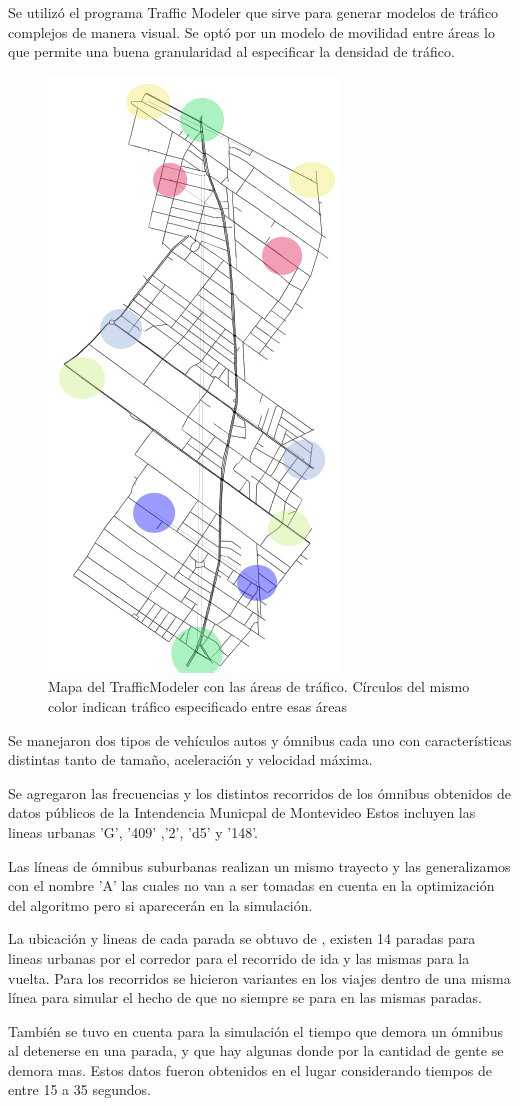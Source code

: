 Se utilizó el programa Traffic Modeler \citep{TrafficModeler} que sirve para generar modelos de tráfico complejos de manera visual. Se optó por un modelo de movilidad entre áreas lo que permite una buena granularidad al especificar la densidad de tráfico.


\begin{figure}[h]
	\centering
	\includegraphics[width=0.3\linewidth]{Figures/areaflow1}
	\caption{Mapa del TrafficModeler con las áreas de tráfico. Círculos del mismo color indican tráfico especificado entre esas áreas}
	\label{fig:areaflow1}
\end{figure}


Se manejaron dos tipos de vehículos autos y ómnibus cada uno con características distintas tanto de tamaño, aceleración y velocidad máxima.

Se agregaron las frecuencias y los distintos recorridos de los ómnibus obtenidos de datos públicos de la Intendencia Municpal de Montevideo \citep{IMM}
Estos incluyen las lineas urbanas  'G', '409' ,'2', 'd5'  y  '148'. 

Las líneas de ómnibus suburbanas realizan  un mismo  trayecto y las generalizamos con el nombre 'A' las cuales no van a ser tomadas en cuenta en la optimización del algoritmo pero si aparecerán en la simulación.

La ubicación y lineas de cada parada se obtuvo de \citep{sigMontevideo}, existen 14 paradas para lineas urbanas por el corredor para el recorrido de ida y las mismas para la vuelta.
Para los recorridos se hicieron  variantes  en  los  viajes  dentro  de  una  misma línea para simular el hecho de que no siempre se para en las mismas paradas.

También se tuvo en cuenta para la simulación el tiempo que demora un ómnibus al detenerse en una parada, y que hay algunas donde por la cantidad de gente se demora mas. Estos datos fueron obtenidos en el lugar considerando tiempos de entre 15 a 35 segundos.

